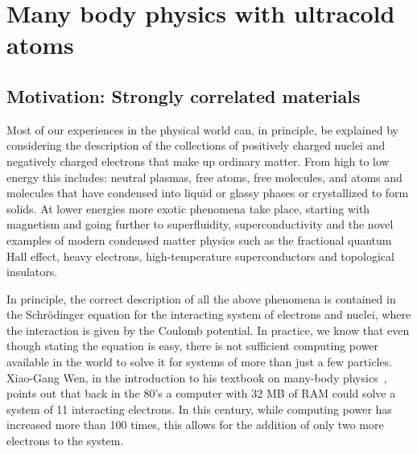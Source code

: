 
\chapter{Many body physics with ultracold atoms } 

\section{ Motivation:  Strongly correlated materials }

Most of our experiences in the physical world can, in principle, be explained
by considering the description of the collections of positively charged nuclei
and negatively charged electrons that make up ordinary matter.    From high to
low energy this includes: neutral plasmas,  free atoms, free  molecules, and
atoms and molecules that have condensed into liquid or glassy phases or
crystallized to form solids.   At lower energies more exotic phenomena take
place, starting with magnetism and going further to superfluidity,
superconductivity and the novel examples of modern condensed matter physics
such as the fractional quantum Hall effect, heavy electrons, high-temperature
superconductors and topological insulators.

In principle,  the correct description of all the above phenomena is contained
in the Schr\"{o}dinger equation for the interacting system of electrons and
nuclei,  where the interaction is given by the Coulomb potential. In practice,
we know that even though stating the equation is easy, there is not sufficient
computing power available in the world to solve it for systems of more than
just a few particles.  Xiao-Gang Wen, in the introduction to his textbook on
many-body physics~\cite{wen2004quantum}, points out that back in the 80's a
computer with 32 MB of RAM could solve a system of 11 interacting electrons.
In this century, while computing power has increased more than 100 times, this
allows for the addition of only two more electrons to the system.  

